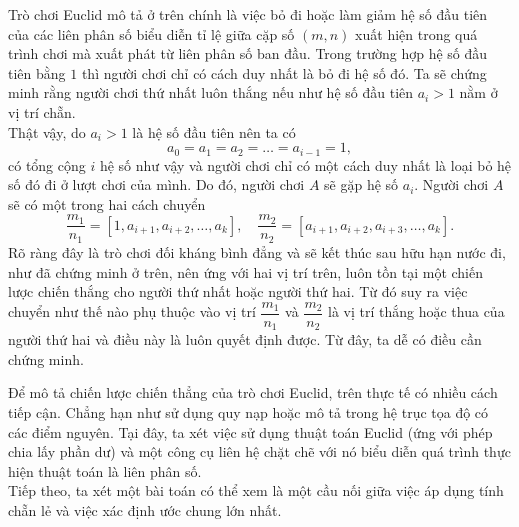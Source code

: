 \begin{vd}
{\begin{enumerate}[(a)]
			Trò chơi Euclid mô tả ở trên chính là việc bỏ đi hoặc làm giảm hệ số đầu tiên của các liên phân số biểu diễn tỉ lệ giữa cặp số $(m,n )$ xuất hiện trong quá trình chơi mà xuất phát từ liên phân số ban đầu. Trong trường hợp hệ số đầu tiên bằng $1$ thì người chơi chỉ có cách duy nhất là bỏ đi hệ số đó. Ta sẽ chứng minh rằng người chơi thứ nhất luôn thắng nếu như hệ số đầu tiên $a_i>1$ nằm ở vị trí chẵn.\\
			Thật vậy, do $a_i>1$ là hệ số đầu tiên nên ta có
			$$a_0=a_1=a_2=\ldots=a_{i-1}=1,$$
			có tổng cộng $i$ hệ số như vậy và người chơi chỉ có một cách duy nhất là loại bỏ hệ số đó đi ở lượt chơi của mình. Do đó, người chơi $A$ sẽ gặp hệ số $a_i$. Người chơi $A$ sẽ có một trong hai cách chuyển
			$$\dfrac{m_1}{n_1}=\left[1,a_{i+1},a_{i+2},\ldots,a_k\right],\quad \dfrac{m_2}{n_2}=\left[a_{i+1},a_{i+2},a_{i+3},\ldots,a_k\right].$$
			Rõ ràng đây là trò chơi đối kháng bình đẳng và sẽ kết thúc sau hữu hạn nước đi, như đã chứng minh ở trên, nên ứng với hai vị trí trên, luôn tồn tại một chiến lược chiến thắng cho người thứ nhất hoặc người thứ hai. Từ đó suy ra việc chuyển như thế nào phụ thuộc vào vị trí $\dfrac{m_1}{n_1}$ và $\dfrac{m_2}{n_2}$ là vị trí thắng hoặc thua của người thứ hai và điều này là luôn quyết định được. Từ đây, ta dễ có điều cần chứng minh. 
		\end{enumerate}
	}
\end{vd}
 Để mô tả chiến lược chiến thẳng của trò chơi Euclid, trên thực tế có nhiều cách tiếp cận. Chẳng hạn như sử dụng quy nạp hoặc mô tả trong hệ trục tọa độ có các điểm nguyên. Tại đây, ta xét việc sử dụng thuật toán Euclid (ứng với phép chia lấy phần dư) và một công cụ liên hệ chặt chẽ với nó biểu diễn quá trình thực hiện thuật toán là liên phân số.\\
Tiếp theo, ta xét một bài toán có thể xem là một cầu nối giữa việc áp dụng tính chẵn lẻ và việc xác định ước chung lớn nhất.

